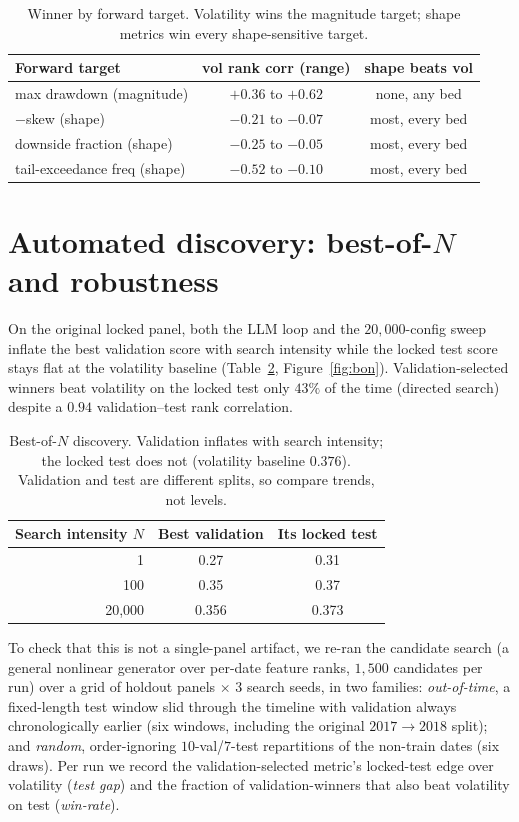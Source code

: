 \documentclass[sigconf,nonacm]{acmart}
\begin{document}
\begin{table}[h]
\centering
\small
\caption{Winner by forward target. Volatility wins the magnitude target; shape metrics
win every shape-sensitive target.}
\label{tab:target}
\begin{tabular}{lcc}
\toprule
Forward target & vol rank corr (range) & shape beats vol \\
\midrule
max drawdown (magnitude) & $+0.36$ to $+0.62$ & none, any bed \\
$-$skew (shape) & $-0.21$ to $-0.07$ & most, every bed \\
downside fraction (shape) & $-0.25$ to $-0.05$ & most, every bed \\
tail-exceedance freq (shape) & $-0.52$ to $-0.10$ & most, every bed \\
\bottomrule
\end{tabular}
\end{table}

\section{Automated discovery: best-of-$N$ and robustness}\label{app:snooping}
On the original locked panel, both the LLM loop and the $20{,}000$-config sweep inflate
the best validation score with search intensity while the locked test
score stays flat at the volatility baseline (Table~\ref{tab:bon}, Figure~\ref{fig:bon}).
Validation-selected winners beat volatility on the locked test only $43\%$ of the time
(directed search) despite a $0.94$ validation--test rank correlation.

\begin{table}[h]
\centering
\caption{Best-of-$N$ discovery. Validation inflates with search intensity; the
locked test does not (volatility baseline $0.376$). Validation and test are
different splits, so compare trends, not levels.}
\label{tab:bon}
\small
\begin{tabular}{rcc}
\toprule
Search intensity $N$ & Best validation & Its locked test \\
\midrule
1 & 0.27 & 0.31 \\
100 & 0.35 & 0.37 \\
20{,}000 & 0.356 & 0.373 \\
\bottomrule
\end{tabular}
\end{table}

To check that this is not a single-panel artifact, we re-ran the
candidate search (a general nonlinear generator over per-date feature ranks, $1{,}500$
candidates per run) over a grid of holdout panels $\times$ $3$ search seeds, in two
families: \emph{out-of-time}, a fixed-length test window slid through the timeline
with validation always chronologically earlier (six windows, including the original
$2017\!\to\!2018$ split); and \emph{random}, order-ignoring $10$-val/$7$-test
repartitions of the non-train dates (six draws). Per run we record the
validation-selected metric's locked-test edge over volatility (\emph{test gap}) and the
fraction of validation-winners that also beat volatility on test (\emph{win-rate}).
\end{document}

